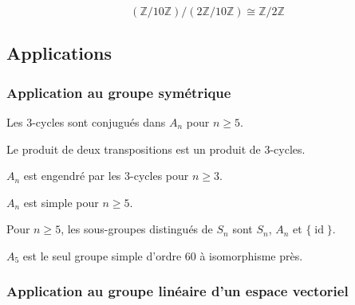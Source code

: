 	\begin{example}
		\[ (\mathbb{Z}/10\mathbb{Z})/(2\mathbb{Z}/10\mathbb{Z}) \cong \mathbb{Z}/2\mathbb{Z} \]
	\end{example}

	\subsection{Applications}

	\subsubsection{Application au groupe symétrique}


  \begin{lemma}
    Les $3$-cycles sont conjugués dans $A_n$ pour $n \geq 5$.
  \end{lemma}


  \begin{lemma}
    Le produit de deux transpositions est un produit de $3$-cycles.
  \end{lemma}

  \begin{proposition}
    $A_n$ est engendré par les $3$-cycles pour $n \geq 3$.
  \end{proposition}


  \begin{theorem}
    $A_n$ est simple pour $n \geq 5$.
  \end{theorem}

	\begin{corollary}
		Pour $n \geq 5$, les sous-groupes distingués de $S_n$ sont $S_n$, $A_n$ et $\{\operatorname{id}\}$.
	\end{corollary}


	\begin{application}
		$A_5$ est le seul groupe simple d'ordre $60$ à isomorphisme près.
	\end{application}

	\subsubsection{Application au groupe linéaire d'un espace vectoriel}

